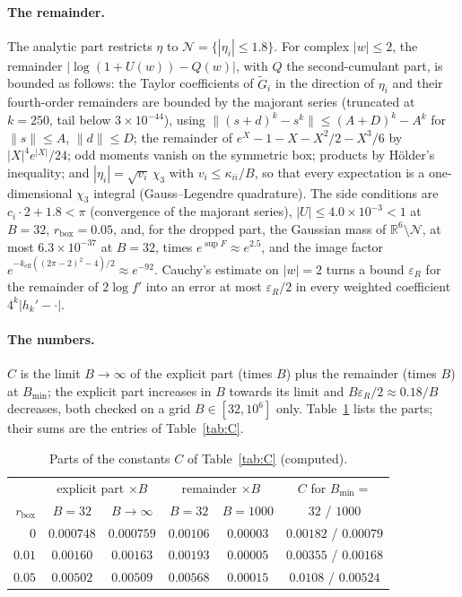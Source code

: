 \documentclass[11pt,a4paper]{article}
\theoremstyle{definition}
\theoremstyle{remark}
\newcommand{\R}{\mathbb{R}}
\begin{document}
\paragraph{The remainder.}
The analytic part restricts $\eta$ to $\mathcal N=\{|\eta_i|\le1.8\}$.
For complex $|w|\le2$, the remainder $|\log(1+U(w))-Q(w)|$, with $Q$ the second-cumulant part, is bounded as follows: the Taylor coefficients of $\tilde G_i$ in the direction of $\eta_i$ and their fourth-order remainders are bounded by the majorant series (truncated at $k=250$, tail below $3\times10^{-44}$), using $\|(s+d)^k-s^k\|\le(A+D)^k-A^k$ for $\|s\|\le A$, $\|d\|\le D$; the remainder of $e^X-1-X-X^2/2-X^3/6$ by $|X|^4e^{|X|}/24$; odd moments vanish on the symmetric box; products by H\"older's inequality; and $|\eta_i|=\sqrt{v_i}\,\chi_3$ with $v_i\le\kappa_{ii}/B$, so that every expectation is a one-dimensional $\chi_3$ integral (Gauss--Legendre quadrature).
The side conditions are $c_i\cdot2+1.8<\pi$ (convergence of the majorant series), $|U|\le4.0\times10^{-3}<1$ at $B=32$, $r_{\mathrm{box}}=0.05$, and, for the dropped part, the Gaussian mass of $\R^6\setminus\mathcal N$, at most $6.3\times10^{-37}$ at $B=32$, times $e^{\sup F}\approx e^{2.5}$, and the image factor $e^{-k_{\mathrm{eff}}((2\pi-2)^2-4)/2}\approx e^{-92}$.
Cauchy's estimate on $|w|=2$ turns a bound $\varepsilon_R$ for the remainder of $2\log f'$ into an error at most $\varepsilon_R/2$ in every weighted coefficient $4^k|h_k'-\cdot|$.

\paragraph{The numbers.}
$C$ is the limit $B\to\infty$ of the explicit part (times $B$) plus the remainder (times $B$) at $B_{\min}$; the explicit part increases in $B$ towards its limit and $B\varepsilon_R/2\approx0.18/B$ decreases, both checked on a grid $B\in[32,10^6]$ only.
Table~\ref{tab:Cparts} lists the parts; their sums are the entries of Table~\ref{tab:C}.

\begin{table}[h]
\centering\small
\caption{Parts of the constants $C$ of Table~\ref{tab:C} (computed).}\label{tab:Cparts}
\begin{tabular}{@{}rccccc@{}}
\toprule
 & \multicolumn{2}{c}{explicit part $\times B$} & \multicolumn{2}{c}{remainder $\times B$} & $C$ for $B_{\min}=$ \\
$r_{\mathrm{box}}$ & $B=32$ & $B\to\infty$ & $B=32$ & $B=1000$ & $32$ / $1000$ \\ \midrule
$0$ & $0.000748$ & $0.000759$ & $0.00106$ & $0.00003$ & $0.00182$ / $0.00079$ \\
$0.01$ & $0.00160$ & $0.00163$ & $0.00193$ & $0.00005$ & $0.00355$ / $0.00168$ \\
$0.05$ & $0.00502$ & $0.00509$ & $0.00568$ & $0.00015$ & $0.0108$ / $0.00524$ \\
\bottomrule
\end{tabular}
\end{table}
\end{document}
